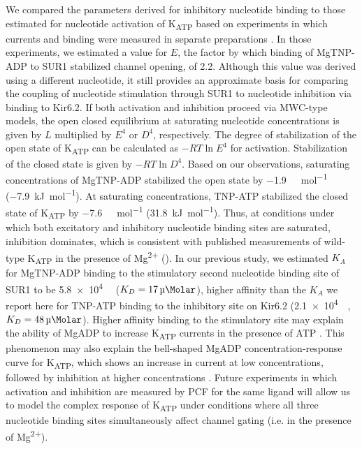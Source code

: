 \documentclass[9pt,lineno, onehalfspacing]{elife_modified}
\begin{document}
We compared the parameters derived for inhibitory nucleotide binding to those estimated for nucleotide activation of K\textsubscript{ATP} based on experiments in which currents and binding were measured in separate preparations \citep{RN80}.
In those experiments, we estimated a value for $E$, the factor by which binding of MgTNP-ADP to SUR1 stabilized channel opening, of 2.2.
Although this value was derived using a different nucleotide, it still provides an approximate basis for comparing the coupling of nucleotide stimulation through SUR1 to nucleotide inhibition via binding to Kir6.2.
If both activation and inhibition proceed via MWC-type models, the open closed equilibrium at saturating nucleotide concentrations is given by $L$ multiplied by $E^4$ or $D^4$, respectively.
The degree of stabilization of the open state of K\textsubscript{ATP} can be calculated as $-RT\ln{E^4}$ for activation.
Stabilization of the closed state is given by $-RT\ln{D^4}$.
Based on our observations, saturating concentrations of MgTNP-ADP stabilized the open state by \SI{-1.9}{\kilo\Calorie\per\mole} (\SI{-7.9}{\kilo\joule\per\mole}).
At saturating concentrations, TNP-ATP stabilized the closed state of K\textsubscript{ATP} by \SI{-7.6}{\kilo\Calorie\per\mole} (\SI{31.8}{\kilo\joule\per\mole}).
Thus, at conditions under which both excitatory and inhibitory nucleotide binding sites are saturated, inhibition dominates, which is consistent with published measurements of wild-type K\textsubscript{ATP} in the presence of Mg\textsuperscript{2+} (\cite{}).
In our previous study, we estimated $K_A$ for MgTNP-ADP binding to the stimulatory second nucleotide binding site of SUR1 to be \SI{5.8e4}{\per\Molar} ($K_D = \SI{17}{\micro\Molar}$), higher affinity than the $K_A$ we report here for TNP-ATP binding to the inhibitory site on Kir6.2 (\SI{2.1e4}{\per\Molar}, $K_D = \SI{48}{\micro\Molar}$).
Higher affinity binding to the stimulatory site may explain the ability of MgADP to increase K\textsubscript{ATP} currents in the presence of ATP \citep{RN82}.
This phenomenon may also explain the bell-shaped MgADP concentration-response curve for K\textsubscript{ATP}, which shows an increase in current at low concentrations, followed by inhibition at higher concentrations \citep{RN28, RN3}.
Future experiments in which activation and inhibition are measured by PCF for the same ligand will allow us to model the complex response of K\textsubscript{ATP} under conditions where all three nucleotide binding sites simultaneously affect channel gating (i.e. in the presence of Mg\textsuperscript{2+}).
\end{document}
